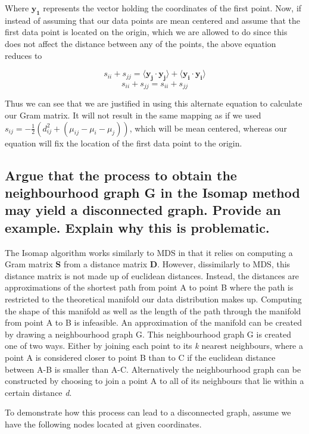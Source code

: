\documentclass[11pt,a4paper,landscape]{article}
\begin{document}
Where $\mathbf{y_{1}}$ represents the vector holding the coordinates of the first point. Now, if instead of assuming that our data points are mean centered and assume that the first data point is located on the origin, which we are allowed to do since this does not affect the distance between any of the points, the above equation reduces to

$$ s_{ii} + s_{jj} = \langle \mathbf{y_{j}} \cdot \mathbf{y_{j}} \rangle + \langle \mathbf{y_{i}} \cdot \mathbf{y_{i}} \rangle$$
$$ s_{ii} + s_{jj} = s_{ii} + s_{jj} $$

Thus we can see that we are justified in using this alternate equation to calculate our Gram matrix. It will not result in the same mapping as if we used $ s_{ij} = -\frac{1}{2}(d^{2}_{ij} +( \mu_{ij} - \mu_{i} - \mu_{j}))$, which will be mean centered, whereas our equation will fix the location of the first data point to the origin.


\subsection{Argue that the process to obtain the neighbourhood graph G in the Isomap method may yield a disconnected graph.  Provide an example.  Explain why this is problematic.}

The Isomap algorithm works similarly to MDS in that it relies on computing a Gram matrix \textbf{S} from a distance matrix \textbf{D}. However, dissimilarly to MDS, this distance matrix is not made up of euclidean distances. Instead, the distances are approximations of the shortest path from point A to point B where the path is restricted to the theoretical manifold our data distribution makes up. Computing the shape of this manifold as well as the length of the path through the manifold from point A to B is infeasible. An approximation of the manifold can be created by drawing a neighbourhood graph G. This neighbourhood graph G is created one of two ways. Either by joining each point to its \textit{k} nearest neighbours, where a point A is considered closer to point B than to C if the euclidean distance between A-B is smaller than A-C.  Alternatively the neighbourhood graph can be constructed by choosing to join a point A to all of its neighbours that lie within a certain distance \textit{d}.\newline


To demonstrate how this process can lead to a disconnected graph,  assume we have the following nodes located at given coordinates.
\end{document}
